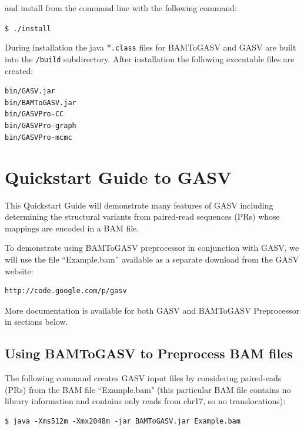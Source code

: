 \documentclass[11pt]{article}
\begin{document}
\noindent and install from the command line with the following command:

\begin{framed}
{\normalsize
\noindent \texttt{\$ ./install}
}
\end{framed}

\noindent During installation the java *\verb+.class+ files for BAMToGASV and GASV are built into the \verb+/build+ subdirectory. After installation the following executable files are created:
	
\begin{framed}
{\normalsize
\noindent \texttt{bin/GASV.jar }\\
\noindent \texttt{bin/BAMToGASV.jar }\\
\noindent \texttt{bin/GASVPro-CC}\\
\noindent \texttt{bin/GASVPro-graph}\\
\noindent \texttt{bin/GASVPro-mcmc}
}
\end{framed}


\section{Quickstart Guide to GASV}

This Quickstart Guide will demonstrate many features of GASV including determining the 
structural variants from paired-read sequences (PRs) whose mappings 
are encoded in a BAM file.

To demonstrate using BAMToGASV preprocessor in conjunction with GASV, we will use the file ``Example.bam'' available as a separate download from the GASV website:

\begin{Verbatim}[frame=single]
http://code.google.com/p/gasv
\end{Verbatim}

More documentation is available for both GASV and BAMToGASV Preprocessor 
in sections below.  

\subsection{Using BAMToGASV to Preprocess BAM files}

The following command creates GASV input files by considering paired-eads (PRs) 
from the BAM file ``Example.bam" (this particular BAM file contains no library information and contains only reads from chr17, so no translocations):
{\normalsize
\begin{Verbatim}[frame=single]
$ java -Xms512m -Xmx2048m -jar BAMToGASV.jar Example.bam
\end{Verbatim}
}
\end{document}
